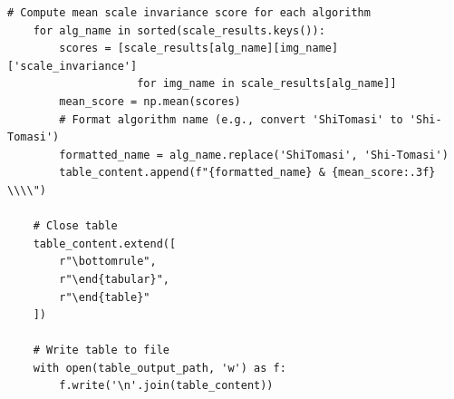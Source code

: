 \documentclass[journal]{IEEEtran}
\begin{document}
\begin{lstlisting}[style=python, caption={Utility Functions for Data Processing}, label={lst:utilities}]
    # Compute mean scale invariance score for each algorithm
    for alg_name in sorted(scale_results.keys()):
        scores = [scale_results[alg_name][img_name]['scale_invariance'] 
                    for img_name in scale_results[alg_name]]
        mean_score = np.mean(scores)
        # Format algorithm name (e.g., convert 'ShiTomasi' to 'Shi-Tomasi')
        formatted_name = alg_name.replace('ShiTomasi', 'Shi-Tomasi')
        table_content.append(f"{formatted_name} & {mean_score:.3f} \\\\")
    
    # Close table
    table_content.extend([
        r"\bottomrule",
        r"\end{tabular}",
        r"\end{table}"
    ])
    
    # Write table to file
    with open(table_output_path, 'w') as f:
        f.write('\n'.join(table_content))
\end{lstlisting}
\end{document}
